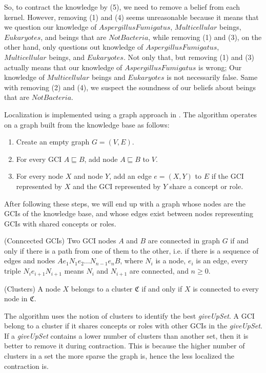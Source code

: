 So, to contract the knowledge by (5), we need to remove a belief from each kernel. However, removing (1) and (4) seems unreasonable because it means that we question our knowledge of $AspergillusFumigatus$, $Multicellular$ beings, $Eukaryotes$, and beings that are $NotBacteria$, while removing (1) and (3), on the other hand, only questions out knowledge of $AspergillusFumigatus$, $Multicellular$ beings, and $Eukaryotes$. Not only that, but removing (1) and (3) actually means that our knowledge of $AspergillusFumigatus$ is wrong; Our knowledge of $Multicellular$ beings and $Eukaryotes$ is not necessarily false. Same with removing (2) and (4), we suspect the soundness of our beliefs about beings that are $NotBacteria$.

Localization is implemented using a graph approach in \cite{zwei}. The algorithm operates on a graph built from the knowledge base as follows:
\begin{enumerate}
\item Create an empty graph $G=(V, E)$.
\item For every GCI $A \sqsubseteq B$, add node $A \sqsubseteq B$ to $V$.
\item For every node $X$ and node $Y$, add an edge $e=(X, Y)$ to $E$ if the GCI represented by $X$ and the GCI represented by $Y$ share a concept or role.
\end{enumerate}

After following these steps, we will end up with a graph whose nodes are the GCIs of the knowledge base, and whose edges exist between nodes representing GCIs with shared concepts or roles. 

\begin{defn}(Conncected GCIs)
Two GCI nodes $A$ and $B$ are connected in graph $G$ if and only if there is a path from one of them to the other, i.e. if there is a sequence of edges and nodes $Ae_1N_1e_2 ... N_{n-1}e_nB$, where $N_i$ is a node, $e_i$ is an edge, every triple $N_ie_{i+1}N_{i+1}$ means $N_i$ and $N_{i+1}$ are connected, and $n \geq 0$.
\end{defn}

\begin{defn}(Clusters)
A node $X$ belongs to a cluster $\mathfrak{C}$ if and only if $X$ is connected to every node in $\mathfrak{C}$.
\end{defn}

The algorithm uses the notion of clusters to identify the best \textit{giveUpSet}. A GCI belong to a cluster if it shares concepts or roles with other GCIs in the \textit{giveUpSet}. If a \textit{giveUpSet} contains a lower number of clusters than another set, then it is better to remove it during contraction. This is because the higher number of clusters in a set the more sparse the graph is, hence the less localized the contraction is.

